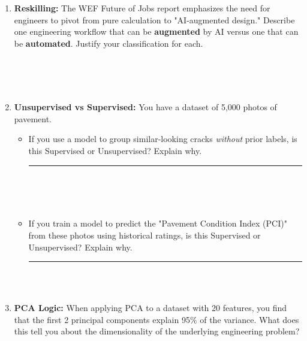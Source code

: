 \documentclass[12pt]{article}
\begin{document}
\begin{enumerate}[label=(\alph*)]
    \item \textbf{Reskilling:} The WEF Future of Jobs report emphasizes the need for engineers to pivot from pure calculation to "AI-augmented design." Describe one engineering workflow that can be \textbf{augmented} by AI versus one that can be \textbf{automated}. Justify your classification for each. 
    
    \fullunderline \\
    
    \fullunderline \\
    
    \fullunderline \\

    \item \textbf{Unsupervised vs Supervised:} You have a dataset of 5,000 photos of pavement. 
    \begin{itemize}
        \item If you use a model to group similar-looking cracks \textit{without} prior labels, is this Supervised or Unsupervised? Explain why. \rule{1.5in}{0.15mm} 
        \\

        
        \fullunderline \\
        
      \fullunderline \\

                
        \item If you train a model to predict the "Pavement Condition Index (PCI)" from these photos using historical ratings, is this Supervised or Unsupervised? Explain why. \rule{1.5in}{0.15mm} \\
        
        \fullunderline \\

        
    \end{itemize}

    \item \textbf{PCA Logic:} When applying PCA to a dataset with 20 features, you find that the first 2 principal components explain 95\% of the variance. What does this tell you about the dimensionality of the underlying engineering problem? \\
    
    \fullunderline \\
    
    \fullunderline \\
    
\end{enumerate}
\end{document}
